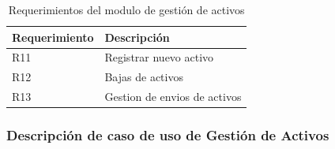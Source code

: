 \begin{table}[H]
	\centering
	\caption{Requerimientos del modulo de gestión de activos}
	\begin{tabular}{|p{9.145em}|p{24.285em}|}
		\toprule
		\rowcolor[rgb]{ .125,  .216,  .392} \textcolor[rgb]{ 1,  1,  1}{\textbf{Requerimiento}} & \textcolor[rgb]{ 1,  1,  1}{\textbf{Descripción}} \\
		\midrule
		R11 & Registrar nuevo activo  \\
		\midrule
		R12 & Bajas de activos  \\
		\midrule
		R13 & Gestion de envios de activos  \\
		\bottomrule
	\end{tabular}%
	\label{tab:MDGDA}%
\end{table}%

\subsubsection{Descripción de caso de uso de Gestión de Activos}


